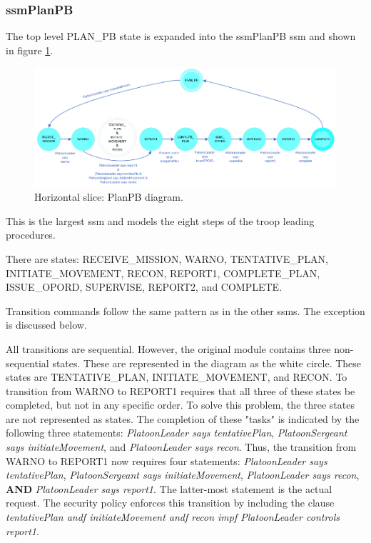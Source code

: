\documentclass[../../main/main.tex]{subfiles}
\begin{document}
\subsubsection{ssmPlanPB}\label{sssec:ssmPlanPB}
The top level PLAN_PB state is expanded into the ssmPlanPB \gls{ssm} and shown in figure \ref{ssmPlanPBDiagram}.

\begin{figure}[h!]
\centering
\includegraphics[width=\textwidth]{../figures/ssmPlanPBDiagram}
\caption{\label{ssmPlanPBDiagram} Horizontal slice: PlanPB diagram.}
\end{figure}

This is the largest \gls{ssm} and models the eight steps of the troop leading procedures.  

There are states: RECEIVE_MISSION, WARNO, TENTATIVE_PLAN, INITIATE_MOVEMENT, RECON, REPORT1, COMPLETE_PLAN, ISSUE_OPORD, SUPERVISE, REPORT2, and COMPLETE.

Transition commands follow the same pattern as in the other \gls{ssm}s.  The exception is discussed below.

All transitions are sequential.  However, the original module contains three non-sequential states.  These are represented in the diagram as the white circle. These states are TENTATIVE_PLAN, INITIATE_MOVEMENT, and RECON.  To transition from WARNO to REPORT1 requires that all three of these states be completed, but not in any specific order.
To solve this problem, the three states are not represented as states.  The completion of these "tasks" is indicated by the following three statements: \textit{PlatoonLeader says tentativePlan}, \textit{PlatoonSergeant says initiateMovement}, and \textit{PlatoonLeader says recon}.  Thus, the transition from WARNO to REPORT1 now requires four statements: \textit{PlatoonLeader says tentativePlan}, \textit{PlatoonSergeant says initiateMovement}, \textit{PlatoonLeader says recon}, \textbf{AND} \textit{PlatoonLeader says report1}. The latter-most statement is the actual request.  The security policy enforces this transition by including the clause \textit{tentativePlan andf initiateMovement andf recon impf PlatoonLeader controls report1}.  
\end{document}
